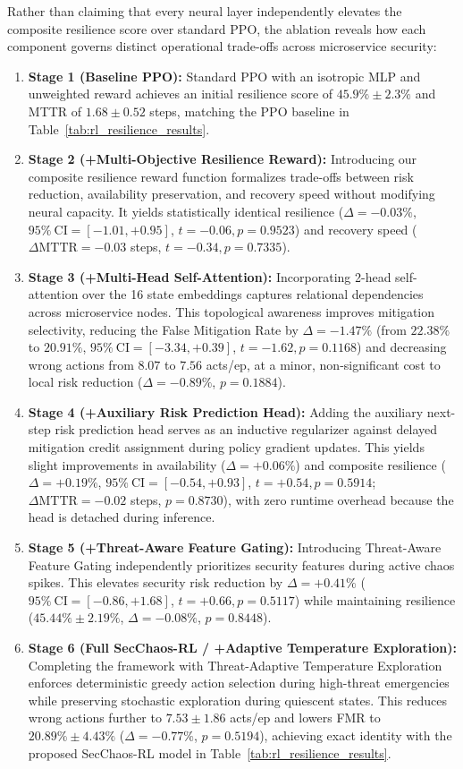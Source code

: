 \documentclass[11pt,a4paper]{article}
\begin{document}
Rather than claiming that every neural layer independently elevates the composite resilience score over standard PPO, the ablation reveals how each component governs distinct operational trade-offs across microservice security:
\begin{enumerate}
    \item \textbf{Stage 1 (Baseline PPO):} Standard PPO with an isotropic MLP and unweighted reward achieves an initial resilience score of $45.9\% \pm 2.3\%$ and MTTR of $1.68 \pm 0.52$ steps, matching the PPO baseline in Table~\ref{tab:rl_resilience_results}.
    \item \textbf{Stage 2 (+Multi-Objective Resilience Reward):} Introducing our composite resilience reward function formalizes trade-offs between risk reduction, availability preservation, and recovery speed without modifying neural capacity. It yields statistically identical resilience ($\Delta = -0.03\%$, $95\%\ \text{CI} = [-1.01, +0.95]$, $t = -0.06, p = 0.9523$) and recovery speed ($\Delta \text{MTTR} = -0.03$ steps, $t = -0.34, p = 0.7335$).
    \item \textbf{Stage 3 (+Multi-Head Self-Attention):} Incorporating 2-head self-attention over the 16 state embeddings captures relational dependencies across microservice nodes. This topological awareness improves mitigation selectivity, reducing the False Mitigation Rate by $\Delta = -1.47\%$ (from $22.38\%$ to $20.91\%$, $95\%\ \text{CI} = [-3.34, +0.39]$, $t = -1.62, p = 0.1168$) and decreasing wrong actions from $8.07$ to $7.56$ acts/ep, at a minor, non-significant cost to local risk reduction ($\Delta = -0.89\%$, $p = 0.1884$).
    \item \textbf{Stage 4 (+Auxiliary Risk Prediction Head):} Adding the auxiliary next-step risk prediction head serves as an inductive regularizer against delayed mitigation credit assignment during policy gradient updates. This yields slight improvements in availability ($\Delta = +0.06\%$) and composite resilience ($\Delta = +0.19\%$, $95\%\ \text{CI} = [-0.54, +0.93]$, $t = +0.54, p = 0.5914$; $\Delta \text{MTTR} = -0.02$ steps, $p = 0.8730$), with zero runtime overhead because the head is detached during inference.
    \item \textbf{Stage 5 (+Threat-Aware Feature Gating):} Introducing Threat-Aware Feature Gating independently prioritizes security features during active chaos spikes. This elevates security risk reduction by $\Delta = +0.41\%$ ($95\%\ \text{CI} = [-0.86, +1.68]$, $t = +0.66, p = 0.5117$) while maintaining resilience ($45.44\% \pm 2.19\%$, $\Delta = -0.08\%$, $p = 0.8448$).
    \item \textbf{Stage 6 (Full SecChaos-RL / +Adaptive Temperature Exploration):} Completing the framework with Threat-Adaptive Temperature Exploration enforces deterministic greedy action selection during high-threat emergencies while preserving stochastic exploration during quiescent states. This reduces wrong actions further to $7.53 \pm 1.86$ acts/ep and lowers FMR to $20.89\% \pm 4.43\%$ ($\Delta = -0.77\%$, $p = 0.5194$), achieving exact identity with the proposed SecChaos-RL model in Table~\ref{tab:rl_resilience_results}.
\end{enumerate}
\end{document}
